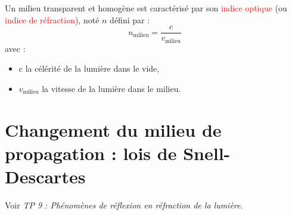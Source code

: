 \begin{tcolorbox}
[colback=green!5!white,colframe=green!75!black,title=\textbf{Indice optique d'un milieu homogène :}, upperbox=invisible]
Un milieu transparent et homogène est caractérisé par son \textcolor{red}{indice optique} (ou \textcolor{red}{indice de réfraction}), noté $n$ défini par :
\begin{equation*}
    n_{\text{milieu}} = \frac{c}{v_{\text{milieu}}}
\end{equation*}
avec :
\begin{itemize}
    \item c la célérité de la lumière dans le vide, 
    \item $v_{\text{milieu}}$ la vitesse de la lumière dans le milieu.
\end{itemize}
\end{tcolorbox}

\section{Changement du milieu de propagation : lois de Snell-Descartes}
\begin{Large}
\end{Large}
Voir \textit{TP 9 : Phénomènes de réflexion en réfraction de la lumière}.
